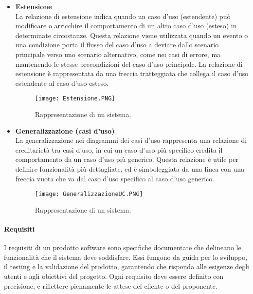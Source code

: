 \begin{itemize}
        \item \textbf{Estensione}\\
        La relazione di estensione indica quando un caso d'uso (estendente) può modificare o arricchire il comportamento di un altro caso d'uso (esteso) in determinate circostanze. Questa relazione viene utilizzata quando un evento o una condizione porta il flusso del caso d'uso a deviare dallo scenario principale verso uno scenario alternativo, come nei casi di errore, ma mantenendo le stesse precondizioni del caso d'uso principale. La relazione di estensione è rappresentata da una freccia tratteggiata che collega il caso d'uso estendente al caso d'uso esteso.
        \begin{figure}[H]
        \centering
        \texttt{[image: Estensione.PNG]}
        \caption{Rappresentazione di un sistema.}
        \end{figure}

        \item \textbf{Generalizzazione (casi d'uso)}\\
        La generalizzazione nei diagrammi dei casi d’uso rappresenta una relazione di ereditarietà tra casi d’uso, in cui un caso d’uso più specifico eredita il comportamento da un caso d’uso più generico. Questa relazione è utile per definire funzionalità più dettagliate, ed è simboleggiata da una linea con una freccia vuota che va dal caso d'uso specifico al caso d'uso generico.
        \begin{figure}[H]
        \centering
        \texttt{[image: GeneralizzazioneUC.PNG]}
        \caption{Rappresentazione di un sistema.}
        \end{figure}
\end{itemize}

\paragraph{Requisiti} I requisiti di un prodotto software sono specifiche documentate che delineano le funzionalità che il sistema deve soddisfare. Essi fungono da guida per lo sviluppo, il testing e la validazione del prodotto, garantendo che risponda alle esigenze degli utenti e agli obiettivi del progetto. Ogni requisito deve essere definito con precisione, e riflettere pienamente le attese del cliente o del proponente.

